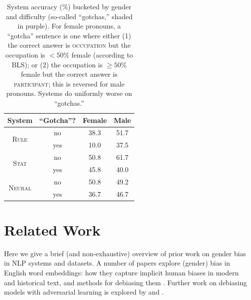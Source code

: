 \documentclass[11pt,a4paper]{article}
\newcommand\capsize{\capsizeinner}
\begin{document}
\begin{table}[htb]
\begin{center}
\small
\begin{tabular}{lccc}
\toprule
System & ``Gotcha''? &   Female      &   Male    \\
\midrule
\multicolumn{1}{c}{\multirow{2}{*}{\textsc{Rule}}} & no &    38.3 &  51.7 \\
                          & \cellcolor[HTML]{CBCEFB}yes  &    \cellcolor[HTML]{CBCEFB}10.0 &  \cellcolor[HTML]{CBCEFB}37.5 \\
\hline
\multicolumn{1}{c}{\multirow{2}{*}{\textsc{Stat}}} & no &    50.8 &  61.7 \\
                          & \cellcolor[HTML]{CBCEFB}yes  &    \cellcolor[HTML]{CBCEFB}45.8 &  \cellcolor[HTML]{CBCEFB}40.0 \\
\hline

\multicolumn{1}{c}{\multirow{2}{*}{\textsc{Neural}}} & no &    50.8 &  49.2 \\
                          & \cellcolor[HTML]{CBCEFB}yes  &    \cellcolor[HTML]{CBCEFB}36.7 &  \cellcolor[HTML]{CBCEFB}46.7 \\
\bottomrule
\end{tabular}
\end{center}
\caption{\capsize System accuracy (\%) bucketed by gender and difficulty (so-called ``gotchas,'' shaded in purple). For female pronouns, a ``gotcha'' sentence is one where either (1) the correct answer is \textsc{occupation} but the occupation is $<50\%$ female (according to BLS); or (2) the occupation is $\geq 50\%$ female but the correct answer is \textsc{participant}; this is reversed for male pronouns. Systems do uniformly worse on ``gotchas.''}
\label{tab:hard}
\end{table}
\vspace{-1.4em}



\section{Related Work}

Here we give a brief (and non-exhaustive) overview of prior work on gender bias in NLP systems and datasets. A number of papers explore (gender) bias in English word embeddings: how they capture implicit human biases in modern \cite{Caliskan183} and historical \cite{Garg201720347} text, and methods for debiasing them \cite{NIPS2016_6228}. Further work on debiasing models with adversarial learning is explored by  and .
\end{document}
